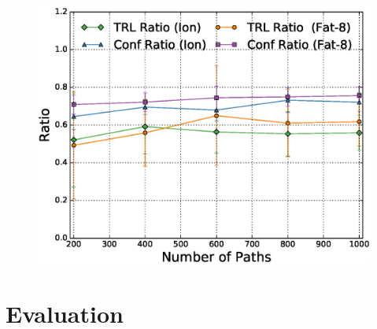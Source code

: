 \begin{figure}[t]
	\centering
	\includegraphics[width=0.7\columnwidth]{figures/ratioMCMC.eps}
	\label{fig:ratiomcmc}
\end{figure}



\section{Evaluation}